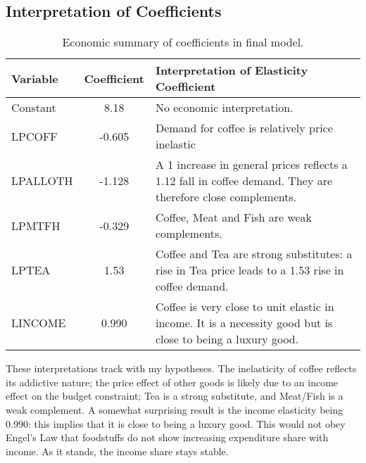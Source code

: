 \documentclass[12pt]{article}
\begin{document}
\subsection{Interpretation of Coefficients} %
\label{sub:interpretation_of_coefficients}
 \begin{table}[!htb]\caption{\label{tb:interp} Economic summary of coefficients in final model.}
    \begin{tabularx}{\linewidth}{lcX}
    \textbf{Variable} & \textbf{Coefficient} & \textbf{Interpretation of Elasticity Coefficient}                                                                                                                                                        \\\hline
    Constant & 8.18        & No economic interpretation.                                                                                                                                           \\
    LPCOFF   & -0.605      & Demand for coffee is relatively price inelastic                                             \\
    LPALLOTH & -1.128      & A 1 increase in general prices reflects a 1.12 fall in coffee demand. They are therefore close complements.  \\
    LPMTFH   & -0.329      & Coffee, Meat and Fish are weak complements.                                                                                                                           \\
    LPTEA    & 1.53        & Coffee and Tea are strong substitutes: a rise in Tea price leads to a 1.53 rise in coffee demand.                                                                     \\
    LINCOME  & 0.990       & Coffee is very close to unit elastic in income. It is a necessity good but is close to being a luxury good.                                                           \\
    \end{tabularx}
\end{table} %
These interpretations track with my hypotheses. The inelasticity of coffee reflects its addictive nature; the price effect of other goods is likely due to an income effect on the budget constraint; Tea is a strong substitute, and Meat/Fish is a weak complement. A somewhat surprising result is the income elasticity being \(0.990\): this implies that it is close to being a luxury good. This would not obey Engel's Law that foodstuffs do not show increasing expenditure share with income. As it stands, the income share stays stable.
\end{document}
